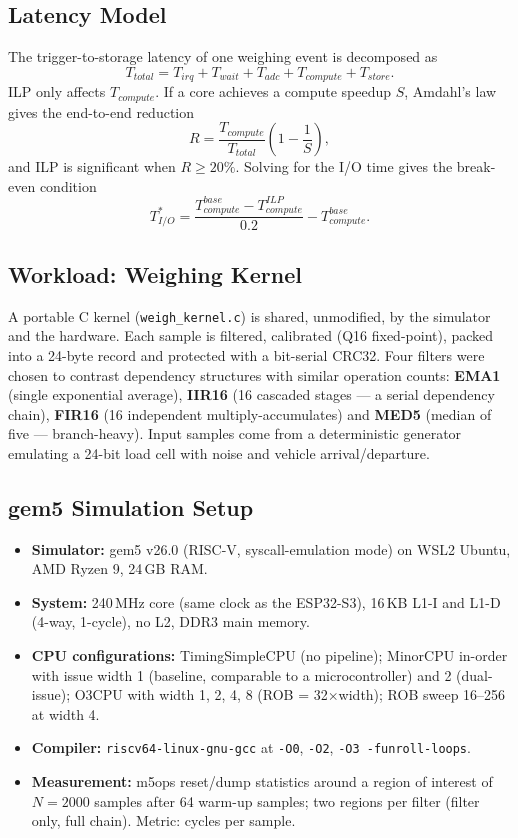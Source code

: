 \documentclass[12pt, a4paper]{article}
\begin{document}
\subsection{Latency Model}
The trigger-to-storage latency of one weighing event is decomposed as
\begin{equation}
T_{total} = T_{irq} + T_{wait} + T_{adc} + T_{compute} + T_{store}.
\end{equation}
ILP only affects $T_{compute}$. If a core achieves a compute speedup $S$, Amdahl's law gives the end-to-end reduction
\begin{equation}
R = \frac{T_{compute}}{T_{total}}\left(1 - \frac{1}{S}\right),
\end{equation}
and ILP is significant when $R \geq 20\%$. Solving for the I/O time gives the break-even condition
\begin{equation}
T_{I/O}^{*} = \frac{T_{compute}^{base} - T_{compute}^{ILP}}{0.2} - T_{compute}^{base}.
\end{equation}

\subsection{Workload: Weighing Kernel}
A portable C kernel (\texttt{weigh\_kernel.c}) is shared, unmodified, by the simulator and the hardware. Each sample is filtered, calibrated (Q16 fixed-point), packed into a 24-byte record and protected with a bit-serial CRC32. Four filters were chosen to contrast dependency structures with similar operation counts: \textbf{EMA1} (single exponential average), \textbf{IIR16} (16 cascaded stages --- a serial dependency chain), \textbf{FIR16} (16 independent multiply-accumulates) and \textbf{MED5} (median of five --- branch-heavy). Input samples come from a deterministic generator emulating a 24-bit load cell with noise and vehicle arrival/departure.

\subsection{gem5 Simulation Setup}
\begin{itemize}
    \item \textbf{Simulator:} gem5 v26.0 (RISC-V, syscall-emulation mode) on WSL2 Ubuntu, AMD Ryzen 9, 24\,GB RAM.
    \item \textbf{System:} 240\,MHz core (same clock as the ESP32-S3), 16\,KB L1-I and L1-D (4-way, 1-cycle), no L2, DDR3 main memory.
    \item \textbf{CPU configurations:} TimingSimpleCPU (no pipeline); MinorCPU in-order with issue width 1 (baseline, comparable to a microcontroller) and 2 (dual-issue); O3CPU with width 1, 2, 4, 8 (ROB = 32$\times$width); ROB sweep 16--256 at width 4.
    \item \textbf{Compiler:} \texttt{riscv64-linux-gnu-gcc} at \texttt{-O0}, \texttt{-O2}, \texttt{-O3 -funroll-loops}.
    \item \textbf{Measurement:} m5ops reset/dump statistics around a region of interest of $N=2000$ samples after 64 warm-up samples; two regions per filter (filter only, full chain). Metric: cycles per sample.
\end{itemize}
\end{document}
